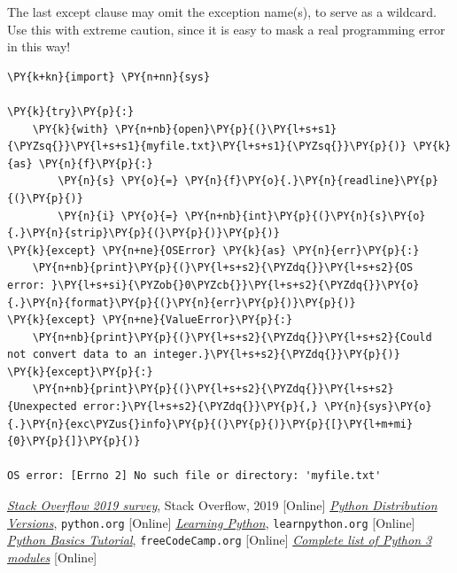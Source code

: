 The last except clause may omit the exception name(s), to serve as a wildcard.
Use this with extreme caution, since it is easy to mask a real programming 
error in this way! 

\begin{codebox}[breakable, size=fbox, boxrule=1pt, pad at break*=1mm,colback=cellbackground, colframe=cellborder]
\begin{Verbatim}[commandchars=\\\{\}]
\PY{k+kn}{import} \PY{n+nn}{sys}
	
\PY{k}{try}\PY{p}{:}
    \PY{k}{with} \PY{n+nb}{open}\PY{p}{(}\PY{l+s+s1}{\PYZsq{}}\PY{l+s+s1}{myfile.txt}\PY{l+s+s1}{\PYZsq{}}\PY{p}{)} \PY{k}{as} \PY{n}{f}\PY{p}{:}
        \PY{n}{s} \PY{o}{=} \PY{n}{f}\PY{o}{.}\PY{n}{readline}\PY{p}{(}\PY{p}{)}
        \PY{n}{i} \PY{o}{=} \PY{n+nb}{int}\PY{p}{(}\PY{n}{s}\PY{o}{.}\PY{n}{strip}\PY{p}{(}\PY{p}{)}\PY{p}{)}
\PY{k}{except} \PY{n+ne}{OSError} \PY{k}{as} \PY{n}{err}\PY{p}{:}
    \PY{n+nb}{print}\PY{p}{(}\PY{l+s+s2}{\PYZdq{}}\PY{l+s+s2}{OS error: }\PY{l+s+si}{\PYZob{}0\PYZcb{}}\PY{l+s+s2}{\PYZdq{}}\PY{o}{.}\PY{n}{format}\PY{p}{(}\PY{n}{err}\PY{p}{)}\PY{p}{)}
\PY{k}{except} \PY{n+ne}{ValueError}\PY{p}{:}
    \PY{n+nb}{print}\PY{p}{(}\PY{l+s+s2}{\PYZdq{}}\PY{l+s+s2}{Could not convert data to an integer.}\PY{l+s+s2}{\PYZdq{}}\PY{p}{)}
\PY{k}{except}\PY{p}{:}
    \PY{n+nb}{print}\PY{p}{(}\PY{l+s+s2}{\PYZdq{}}\PY{l+s+s2}{Unexpected error:}\PY{l+s+s2}{\PYZdq{}}\PY{p}{,} \PY{n}{sys}\PY{o}{.}\PY{n}{exc\PYZus{}info}\PY{p}{(}\PY{p}{)}\PY{p}{[}\PY{l+m+mi}{0}\PY{p}{]}\PY{p}{)}
	
OS error: [Errno 2] No such file or directory: 'myfile.txt'
\end{Verbatim}
\end{codebox}

\begin{thebibliography}{9}
 \href{https://insights.stackoverflow.com/survey/2019}{\emph{Stack Overflow 2019 survey}}, Stack Overflow, 2019 [Online]
 \href{https://www.python.org/downloads/}{\emph{Python Distribution Versions}}, \texttt{python.org} [Online]
 \href{https://www.learnpython.org/it/}{\emph{Learning Python}}, \texttt{learnpython.org} [Online]
 \href{https://www.youtube.com/watch?v=8DvywoWv6fI}{\emph{Python Basics Tutorial}}, \texttt{freeCodeCamp.org} [Online]
 \href{https://docs.python.org/3/py-modindex.html}{\emph{Complete list of Python 3 modules}} [Online]
\end{thebibliography}
